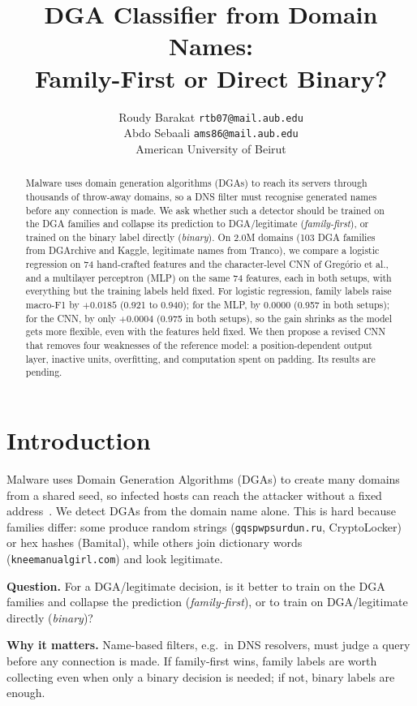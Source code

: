 \documentclass[11pt]{article}
\title{\vspace{-2.2em}\textbf{DGA Classifier from Domain Names:\\Family-First or Direct Binary?}}
\author{
  Roudy Barakat \quad \texttt{rtb07@mail.aub.edu} \\
  Abdo Sebaali \quad \texttt{ams86@mail.aub.edu} \\[0.3em]
  \small American University of Beirut
}
\date{\vspace{-1.5em}}
\begin{document}
\maketitle

\begin{abstract}
\noindent Malware uses domain generation algorithms (DGAs) to reach its servers
through thousands of throw-away domains, so a DNS filter must recognise generated
names before any connection is made. We ask whether such a detector should be
trained on the DGA families and collapse its prediction to DGA/legitimate
(\emph{family-first}), or trained on the binary label directly (\emph{binary}). On
2.0M domains (103 DGA families from DGArchive and Kaggle, legitimate names from
Tranco), we compare a logistic regression on 74 hand-crafted features and the
character-level CNN of Greg{\'o}rio et al., and a multilayer perceptron (MLP) on the
same 74 features, each in both setups, with everything but the training labels held
fixed. For logistic regression, family labels raise macro-F1 by $+0.0185$ (0.921 to
0.940); for the MLP, by $0.0000$ (0.957 in both setups); for the CNN, by only
$+0.0004$ (0.975 in both setups), so the gain shrinks as the model gets more
flexible, even with the features held fixed. We then propose a revised CNN
that removes four weaknesses of the reference model: a position-dependent output
layer, inactive units, overfitting, and computation spent on padding. Its results
are pending.
\end{abstract}

\section{Introduction}
Malware uses Domain Generation Algorithms (DGAs) to create many domains from a
shared seed, so infected hosts can reach the attacker without a fixed
address~\cite{plohmann2016dgarchive}. We detect DGAs from the domain name alone.
This is hard because families differ: some produce random strings
(\texttt{gqspwpsurdun.ru}, CryptoLocker) or hex hashes (Bamital), while others join
dictionary words (\texttt{kneemanualgirl.com}) and look legitimate.

\textbf{Question.} For a DGA/legitimate decision, is it better to train on the
DGA families and collapse the prediction (\emph{family-first}), or to train on
DGA/legitimate directly (\emph{binary})?

\textbf{Why it matters.} Name-based filters, e.g.\ in DNS resolvers, must judge a
query before any connection is made. If family-first wins, family labels are
worth collecting even when only a binary decision is needed; if not, binary
labels are enough.
\end{document}
